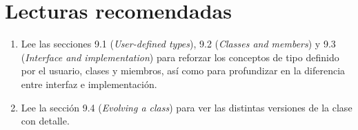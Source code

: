 \section{Lecturas recomendadas}

\begin{enumerate}

\item Lee las secciones 9.1 (\emph{User-defined types}), 9.2 (\emph{Classes and members})
      y 9.3 (\emph{Interface and implementation}) para reforzar los conceptos de
      tipo definido por el usuario, clases y miembros, así como para profundizar
      en la diferencia entre interfaz e implementación.

\item Lee la sección 9.4 (\emph{Evolving a class}) para ver las distintas versiones
      de la clase  con detalle.

\end{enumerate}
